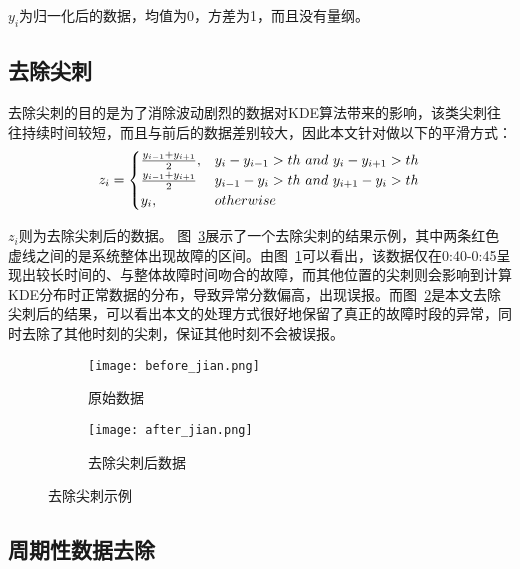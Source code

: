 $y_i$为归一化后的数据，均值为0，方差为1，而且没有量纲。
\subsection{去除尖刺}
去除尖刺的目的是为了消除波动剧烈的数据对KDE算法带来的影响，该类尖刺往往持续时间较短，而且与前后的数据差别较大，因此本文针对做以下的平滑方式：
\begin{equation*}
z_i = \begin{cases} \frac{y_{i-1} + y_{i+1}}{2}, & y_i - y_{i-1} > th\ and\ y_i - y_{i+1} > th \cr \frac{y_{i-1} + y_{i+1}}{2} & y_{i-1} - y_i > th\ and\ y_{i+1} - y_i > th \cr y_i, & otherwise  \end{cases}
\end{equation*}

$z_i$则为去除尖刺后的数据。
图~\ref{fig:smooth}展示了一个去除尖刺的结果示例，其中两条红色虚线之间的是系统整体出现故障的区间。由图~\ref{fig:smooth:left}可以看出，该数据仅在0:40-0:45呈现出较长时间的、与整体故障时间吻合的故障，而其他位置的尖刺则会影响到计算KDE分布时正常数据的分布，导致异常分数偏高，出现误报。而图~\ref{fig:smooth:right}是本文去除尖刺后的结果，可以看出本文的处理方式很好地保留了真正的故障时段的异常，同时去除了其他时刻的尖刺，保证其他时刻不会被误报。

\begin{figure}[htbp]
  \begin{subfigure}[b]{0.5\textwidth}
    \begin{minipage}[t]{\linewidth}
    \centering
    \texttt{[image: before\_jian.png]}
    \caption{原始数据}
    \label{fig:smooth:left}
    \end{minipage}
  \end{subfigure}
  \begin{subfigure}[b]{0.5\textwidth}
    \begin{minipage}[t]{\linewidth}
    \centering
    \texttt{[image: after\_jian.png]}
    \caption{去除尖刺后数据}
    \label{fig:smooth:right}
    \end{minipage}
  \end{subfigure}
    \caption{去除尖刺示例}
    \label{fig:smooth}
\end{figure}

\subsection{周期性数据去除}

